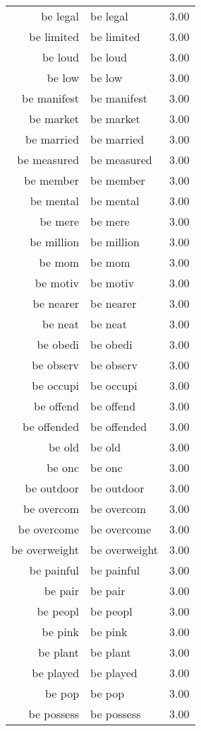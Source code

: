 \begin{table}[ht]
\begin{tabular}{rlr}
  be legal & be legal & 3.00 \\ 
  be limited & be limited & 3.00 \\ 
  be loud & be loud & 3.00 \\ 
  be low & be low & 3.00 \\ 
  be manifest & be manifest & 3.00 \\ 
  be market & be market & 3.00 \\ 
  be married & be married & 3.00 \\ 
  be measured & be measured & 3.00 \\ 
  be member & be member & 3.00 \\ 
  be mental & be mental & 3.00 \\ 
  be mere & be mere & 3.00 \\ 
  be million & be million & 3.00 \\ 
  be mom & be mom & 3.00 \\ 
  be motiv & be motiv & 3.00 \\ 
  be nearer & be nearer & 3.00 \\ 
  be neat & be neat & 3.00 \\ 
  be obedi & be obedi & 3.00 \\ 
  be observ & be observ & 3.00 \\ 
  be occupi & be occupi & 3.00 \\ 
  be offend & be offend & 3.00 \\ 
  be offended & be offended & 3.00 \\ 
  be old & be old & 3.00 \\ 
  be onc & be onc & 3.00 \\ 
  be outdoor & be outdoor & 3.00 \\ 
  be overcom & be overcom & 3.00 \\ 
  be overcome & be overcome & 3.00 \\ 
  be overweight & be overweight & 3.00 \\ 
  be painful & be painful & 3.00 \\ 
  be pair & be pair & 3.00 \\ 
  be peopl & be peopl & 3.00 \\ 
  be pink & be pink & 3.00 \\ 
  be plant & be plant & 3.00 \\ 
  be played & be played & 3.00 \\ 
  be pop & be pop & 3.00 \\ 
  be possess & be possess & 3.00 \\ 

\end{tabular}
\end{table}
